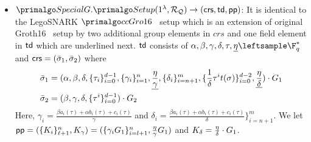 \begin{itemize}
\item $\SpecialG.\Setup(1^{\lambda}, \relRQ) \rightarrow (\crs, \tw,\pp)$:  It is identical to the LegoSNARK  $\ccgroth$~\cite[Fig.~22]{LegoSNARK} setup which  is  an extension of original Groth16~\cite{Groth16} setup by two additional group elements in $ crs $ and one field element in $ \mathsf{td}$ which are underlined next. $\mathsf{td} $ consists of $ \alpha, \beta, \gamma, \delta, \tau, \underline{\eta} \leftsample \F_q^*$ and $\mathsf{crs} = (\bar{\sigma}_1, \bar{\sigma}_2)$ where 
\begin{align*}
\bar{\sigma}_1 &= (\alpha  , \beta  , \delta  , \{\tau_i  \}_{i=0}^{d-1}, \{\gamma_i\}_{i=1}^n, \underline{\frac{\eta}{\gamma}}, \{\delta_i\}_{i=n+1}^m, \{\frac{1}{\delta}\tau^it(\sigma) \}_{i=0}^{d-2}, \underline{\frac{\eta}{\delta}})\cdot {G}_1 \\
\bar{\sigma}_2 &= (\beta  , \gamma  , \delta  , \{\tau^i  \}_{i=0}^{d-1})\cdot {G}_2
\end{align*}
Here, $ \gamma_i = \frac{\beta a_i(\tau)+ \alpha b_i(\tau)+ c_i(\tau)}{\gamma} $ and $ \delta_i =\frac{\beta a_i(\tau)+ \alpha b_i(\tau)+ c_i(\tau)}{\delta} \}_{i=n+1}^m  $.
We let $\mathsf{pp} = (\{K_i\}_{\ell+1}^n,K_\gamma) = (\{\gamma_i{G}_1\}_{i=l+1}^{n},   \frac{\eta}{\gamma}{G}_1 )$ and $K_{\delta} = \frac{\eta}{\delta} \cdot {G}_1$.


\end{itemize}
